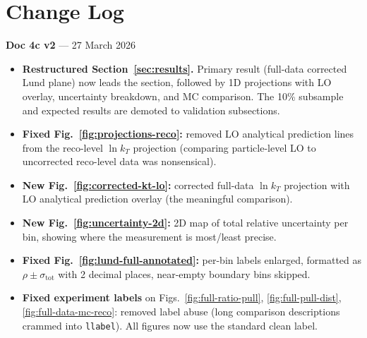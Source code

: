 \documentclass[11pt,a4paper]{article}
\begin{document}
\tableofcontents
\clearpage

\section*{Change Log}

\textbf{Doc 4c v2} --- 27 March 2026
\begin{itemize}
\item \textbf{Restructured Section~\ref{sec:results}.}  Primary result (full-data corrected Lund plane) now leads the section, followed by 1D projections with LO overlay, uncertainty breakdown, and MC comparison.  The 10\% subsample and expected results are demoted to validation subsections.
\item \textbf{Fixed Fig.~\ref{fig:projections-reco}:} removed LO analytical prediction lines from the reco-level $\ln k_T$ projection (comparing particle-level LO to uncorrected reco-level data was nonsensical).
\item \textbf{New Fig.~\ref{fig:corrected-kt-lo}:} corrected full-data $\ln k_T$ projection with LO analytical prediction overlay (the meaningful comparison).
\item \textbf{New Fig.~\ref{fig:uncertainty-2d}:} 2D map of total relative uncertainty per bin, showing where the measurement is most/least precise.
\item \textbf{Fixed Fig.~\ref{fig:lund-full-annotated}:} per-bin labels enlarged, formatted as $\rho \pm \sigma_\text{tot}$ with 2 decimal places, near-empty boundary bins skipped.
\item \textbf{Fixed experiment labels} on Figs.~\ref{fig:full-ratio-pull}, \ref{fig:full-pull-dist}, \ref{fig:full-data-mc-reco}: removed label abuse (long comparison descriptions crammed into \texttt{llabel}).  All figures now use the standard clean label.
\end{itemize}

\medskip
\end{document}
